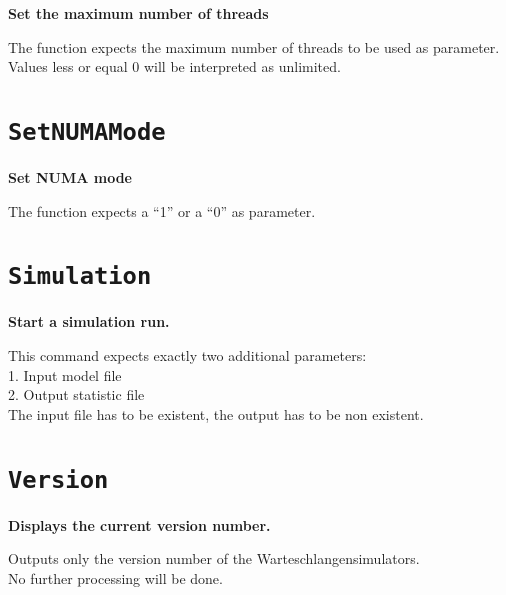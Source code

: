 \textbf{Set the maximum number of threads}

The function expects the maximum number of threads to be used as parameter.\\
Values less or equal 0 will be interpreted as unlimited.

\section{\texttt{SetNUMAMode}}

\textbf{Set NUMA mode}

The function expects a "`1"' or a "`0"' as parameter.

\section{\texttt{Simulation}}

\textbf{Start a simulation run.}

This command expects exactly two additional parameters:\\
1. Input model file\\
2. Output statistic file\\
The input file has to be existent, the output has to be non existent.

\section{\texttt{Version}}

\textbf{Displays the current version number.}

Outputs only the version number of the Warteschlangensimulators.\\
No further processing will be done.

